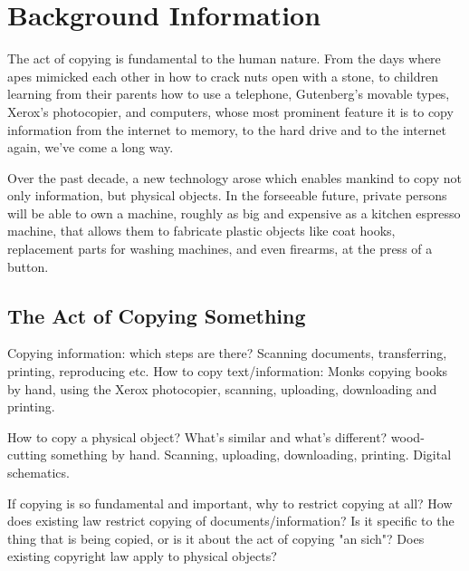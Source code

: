 \section{Background Information}

The act of copying is fundamental to the human nature.  From the days where apes
mimicked each other in how to crack nuts open with a stone, to children
learning from their parents how to use a telephone, Gutenberg's movable types,
Xerox's photocopier, and computers, whose most prominent feature it is to copy
information from the internet to memory, to the hard drive and to the internet
again, we've come a long way.

Over the past decade, a new technology arose which enables mankind to copy not
only information, but physical objects.  In the forseeable future, private
persons will be able to own a machine, roughly as big and expensive as a
kitchen espresso machine, that allows them to fabricate plastic objects like
coat hooks, replacement parts for washing machines, and even firearms, at the
press of a button.

\subsection{The Act of Copying Something}

Copying information: which steps are there?  Scanning documents, transferring,
printing, reproducing etc.  How to copy text/information: Monks copying books
by hand, using the Xerox photocopier, scanning, uploading, downloading and
printing.

How to copy a physical object?  What's similar and what's different?
wood-cutting something by hand.  Scanning, uploading, downloading, printing.
Digital schematics.

If copying is so fundamental and important, why to restrict copying at all?
How does existing law restrict copying of documents/information?  Is it
specific to the thing that is being copied, or is it about the act of copying
"an sich"?  Does existing copyright law apply to physical objects?
